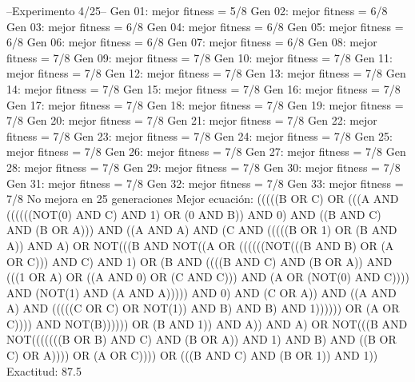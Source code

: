 --Experimento 
 4/25--
Gen 01: mejor fitness = 5/8
Gen 02: mejor fitness = 6/8
Gen 03: mejor fitness = 6/8
Gen 04: mejor fitness = 6/8
Gen 05: mejor fitness = 6/8
Gen 06: mejor fitness = 6/8
Gen 07: mejor fitness = 6/8
Gen 08: mejor fitness = 7/8
Gen 09: mejor fitness = 7/8
Gen 10: mejor fitness = 7/8
Gen 11: mejor fitness = 7/8
Gen 12: mejor fitness = 7/8
Gen 13: mejor fitness = 7/8
Gen 14: mejor fitness = 7/8
Gen 15: mejor fitness = 7/8
Gen 16: mejor fitness = 7/8
Gen 17: mejor fitness = 7/8
Gen 18: mejor fitness = 7/8
Gen 19: mejor fitness = 7/8
Gen 20: mejor fitness = 7/8
Gen 21: mejor fitness = 7/8
Gen 22: mejor fitness = 7/8
Gen 23: mejor fitness = 7/8
Gen 24: mejor fitness = 7/8
Gen 25: mejor fitness = 7/8
Gen 26: mejor fitness = 7/8
Gen 27: mejor fitness = 7/8
Gen 28: mejor fitness = 7/8
Gen 29: mejor fitness = 7/8
Gen 30: mejor fitness = 7/8
Gen 31: mejor fitness = 7/8
Gen 32: mejor fitness = 7/8
Gen 33: mejor fitness = 7/8
No mejora en 25 generaciones
Mejor ecuación: (((((B OR C) OR (((A AND ((((((NOT(0) AND C) AND 1) OR (0 AND B)) AND 0) AND ((B AND C) AND (B OR A))) AND ((A AND A) AND (C AND (((((B OR 1) OR (B AND A)) AND A) OR NOT(((B AND NOT((A OR ((((((NOT(((B AND B) OR (A OR C))) AND C) AND 1) OR (B AND ((((B AND C) AND (B OR A)) AND (((1 OR A) OR ((A AND 0) OR (C AND C))) AND (A OR (NOT(0) AND C)))) AND (NOT(1) AND (A AND A))))) AND 0) AND (C OR A)) AND ((A AND A) AND (((((C OR C) OR NOT(1)) AND B) AND B) AND 1)))))) OR (A OR C)))) AND NOT(B)))))) OR (B AND 1)) AND A)) AND A) OR NOT(((B AND NOT(((((((B OR B) AND C) AND (B OR A)) AND 1) AND B) AND ((B OR C) OR A)))) OR (A OR C)))) OR (((B AND C) AND (B OR 1)) AND 1))
 Exactitud: 87.5%


